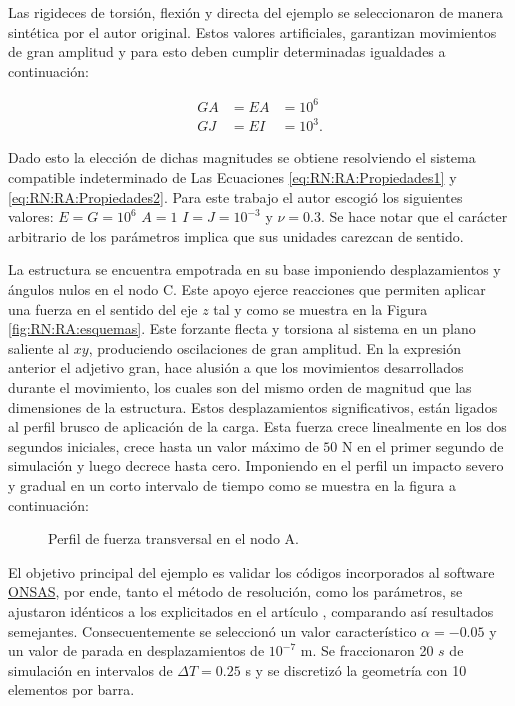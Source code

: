 Las rigideces de torsión, flexión y directa del ejemplo se seleccionaron de manera sintética por el autor original. Estos valores artificiales, garantizan movimientos de gran amplitud y para esto deben cumplir determinadas igualdades a continuación:

\begin{eqnarray}
	\label{eq:RN:RA:Propiedades1}
	GA &= EA& =10^6\\
	\label{eq:RN:RA:Propiedades2}
	GJ &= EI& =10^3.
\end{eqnarray}

Dado esto la elección de dichas magnitudes se obtiene resolviendo el sistema compatible indeterminado de Las Ecuaciones \eqref{eq:RN:RA:Propiedades1} y \eqref{eq:RN:RA:Propiedades2}. Para este trabajo el autor escogió los siguientes valores: $ E=G=10^6$ $A=1 $  $I=J=10^{-3}$ y $\nu=0.3$. Se hace notar que el carácter arbitrario de los parámetros implica que sus unidades carezcan de sentido. 


La estructura se encuentra empotrada en su base imponiendo desplazamientos y ángulos nulos en el nodo C. Este apoyo ejerce reacciones que permiten aplicar una fuerza en el sentido del eje $z$ tal y como se muestra en la Figura \ref{fig:RN:RA:esquemas}. Este forzante flecta y torsiona al sistema en un plano saliente al $xy$, produciendo oscilaciones de gran amplitud. En la expresión anterior el adjetivo gran, hace alusión a que los movimientos desarrollados durante el movimiento, los cuales son del mismo orden de magnitud que las dimensiones de la estructura. Estos desplazamientos significativos, están ligados al perfil brusco de aplicación de la carga. Esta fuerza crece linealmente en los dos segundos iniciales, crece hasta un valor máximo de $50$ N en el primer segundo de simulación y luego decrece hasta cero. Imponiendo en el perfil un impacto severo y gradual en un corto intervalo de tiempo como se muestra en la figura a continuación: 

\begin{figure}[htbp]
	\centering
	\def\svgwidth{90mm}
	
	\caption{Perfil de fuerza transversal en el nodo A.}
	\label{fig:RN:RA:Force}
\end{figure}

El objetivo principal del ejemplo es validar los códigos incorporados al software \href{https://github.com/ONSAS/ONSAS.m/}{ONSAS}, por ende, tanto el método de resolución, como los parámetros, se ajustaron idénticos a los explicitados en el artículo \citep{Le2014}, comparando así resultados semejantes. Consecuentemente se seleccionó un valor característico $\alpha=-0.05$ y un valor de parada en desplazamientos de $10^{-7}$ m. Se fraccionaron 20 $s$ de simulación en intervalos de $\Delta T=0.25$ s y se discretizó la geometría con 10 elementos por barra.

